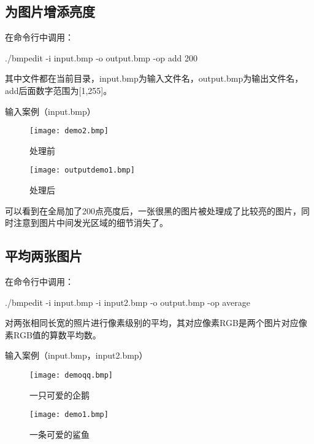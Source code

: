 \documentclass[11pt]{article}
\begin{document}
\subsection{为图片增添亮度}
在命令行中调用：
\begin{commandline}
./bmpedit -i input.bmp -o output.bmp -op add 200
\end{commandline}
其中文件都在当前目录，input.bmp为输入文件名，output.bmp为输出文件名，add后面数字范围为[1,255]。


输入案例（input.bmp）
\begin{figure}[H]
  \centering
  \begin{minipage}[b]{0.45\textwidth}
    \centering
    \texttt{[image: demo2.bmp]}
   \caption{处理前}
    \label{fig:image1}
  \end{minipage}
  \hfill %
  \begin{minipage}[b]{0.45\textwidth}
    \centering
    \texttt{[image: outputdemo1.bmp]}
  \caption{处理后}
    \label{fig:image2}
  \end{minipage}
\end{figure}
可以看到在全局加了200点亮度后，一张很黑的图片被处理成了比较亮的图片，同时注意到图片中间发光区域的细节消失了。



\subsection{平均两张图片}
在命令行中调用：
\begin{commandline}
./bmpedit -i input.bmp -i input2.bmp -o output.bmp -op average
\end{commandline}
对两张相同长宽的照片进行像素级别的平均，其对应像素RGB是两个图片对应像素RGB值的算数平均数。


输入案例（input.bmp，input2.bmp）
\begin{figure}[H]
  \centering
  \begin{minipage}[b]{0.45\textwidth}
    \centering
    \texttt{[image: demoqq.bmp]}
   \caption{一只可爱的企鹅}
    \label{fig:image1}
  \end{minipage}
  \hfill %
  \begin{minipage}[b]{0.45\textwidth}
    \centering
    \texttt{[image: demo1.bmp]}
  \caption{一条可爱的鲨鱼}
    \label{fig:image2}
  \end{minipage}
\end{figure}
\end{document}
